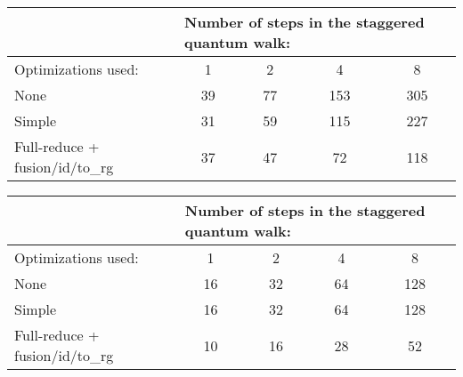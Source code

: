 \begin{table}[H]
\centering
\begin{tabular}{|l|cccc|}
\hline
                               & \multicolumn{4}{l|}{Number of steps in the staggered quantum walk:}                                   \\ \hline
Optimizations used:          & \multicolumn{1}{c|}{1}  & \multicolumn{1}{c|}{2}  & \multicolumn{1}{c|}{4}   & 8   \\ \hline
None            & \multicolumn{1}{c|}{39} & \multicolumn{1}{c|}{77} & \multicolumn{1}{c|}{153} & 305 \\ \hline
Simple     & \multicolumn{1}{c|}{31} & \multicolumn{1}{c|}{59} & \multicolumn{1}{c|}{115} & 227 \\ \hline
Full-reduce + fusion/id/to\_rg & \multicolumn{1}{c|}{37} & \multicolumn{1}{c|}{47} & \multicolumn{1}{c|}{72}  & 118 \\ \hline
\end{tabular}

\end{table}
\caption{Number of total gates in the circuit in relation to the simplification routines used}
\begin{table}[H]
\centering
\begin{tabular}{|l|cccc|}
\hline
                               & \multicolumn{4}{l|}{Number of steps in the staggered quantum walk:}                                  \\ \hline
Optimizations used:          & \multicolumn{1}{c|}{1}  & \multicolumn{1}{c|}{2}  & \multicolumn{1}{c|}{4}  & 8   \\ \hline
None            & \multicolumn{1}{c|}{16} & \multicolumn{1}{c|}{32} & \multicolumn{1}{c|}{64} & 128 \\ \hline
Simple       & \multicolumn{1}{c|}{16} & \multicolumn{1}{c|}{32} & \multicolumn{1}{c|}{64} & 128 \\ \hline
Full-reduce + fusion/id/to\_rg & \multicolumn{1}{c|}{10} & \multicolumn{1}{c|}{16} & \multicolumn{1}{c|}{28} & 52  \\ \hline
\end{tabular}
\end{table}
\caption{T-count in the circuit in relation to the simplification routines used}










